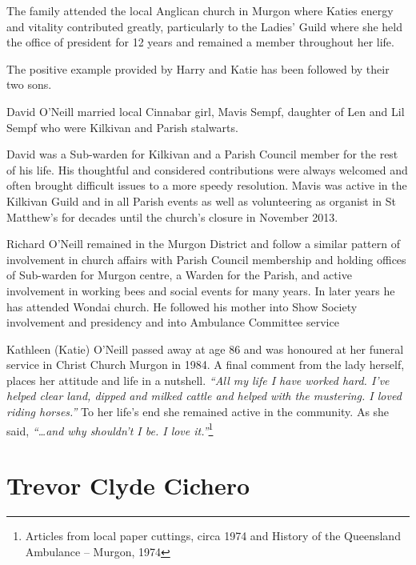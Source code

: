 The family attended the local Anglican church in Murgon where Katies energy and vitality contributed greatly, particularly to the Ladies' Guild where she held the office of president for 12 years and remained a member throughout her life.



The positive example provided by Harry and Katie has been followed by their two sons.



David O'Neill married local Cinnabar girl, Mavis Sempf, daughter of Len and Lil Sempf who were Kilkivan and Parish stalwarts.



David was a Sub-warden for Kilkivan and a Parish Council member for the rest of his life. His thoughtful and considered contributions were always welcomed and often brought difficult issues to a more speedy resolution. Mavis was active in the Kilkivan Guild and in all Parish events as well as volunteering as organist in St Matthew's for decades until the church's closure in November 2013.



Richard O'Neill remained in the Murgon District and follow a similar pattern of involvement in church affairs with Parish Council membership and holding offices of Sub-warden for Murgon centre, a Warden for the Parish, and active involvement in working bees and social events for many years. In later years he has attended Wondai church. He followed his mother into Show Society involvement and presidency and into Ambulance Committee service



Kathleen (Katie) O'Neill passed away at age 86 and was honoured at her funeral service in Christ Church Murgon in 1984. A final comment from the lady herself, places her attitude and life in a nutshell. \emph{``All my life I have worked hard. I've helped clear land, dipped and milked cattle and helped with the mustering. I loved riding horses.''} To her life's end she remained active in the community. As she said, \emph{``\ldots and why shouldn't I be. I love it.''}\footnote{Articles from local paper cuttings, circa 1974 and History of the Queensland Ambulance -- Murgon, 1974}


\section{Trevor Clyde Cichero}



